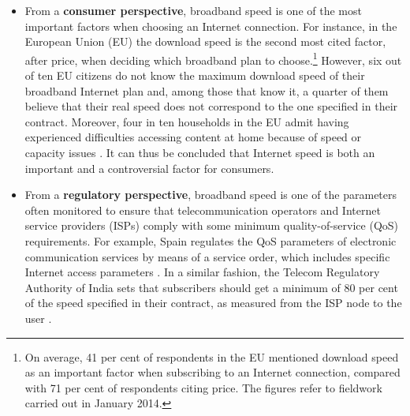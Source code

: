 \documentclass[12pt]{article}
\begin{document}
\begin{itemize}

	\item From a \textbf{consumer perspective}, broadband speed is one of the most important factors when choosing an Internet connection. For instance, in the European Union (EU) the download speed is the second most cited factor, after price, when deciding which broadband plan to choose.\footnote{On average, 41 per cent of respondents in the EU mentioned download speed as an important factor when subscribing to an Internet connection, compared with 71 per cent of respondents citing price. The figures refer to fieldwork carried out in January 2014.} However, six out of ten EU citizens do not know the maximum download speed of their broadband Internet plan and, among those that know it, a quarter of them believe that their real speed does not correspond to the one specified in their contract. Moreover, four in ten households in the EU admit having experienced difficulties accessing content at home because of speed or capacity issues \citep{eurobarometer}. It can thus be concluded that Internet speed is both an important and a controversial factor for consumers. 
	
	\item From a \textbf{regulatory perspective}, broadband speed is one of the parameters often monitored to ensure that telecommunication operators and Internet service providers (ISPs) comply with some minimum quality-of-service (QoS) requirements. For example, Spain regulates the QoS parameters of electronic communication services by means of a service order, which includes specific Internet access parameters \citep[Annex I, Part II in ][]{boe}. In a similar fashion, the Telecom Regulatory Authority of India sets that subscribers should get a minimum of 80 per cent of the speed specified in their contract, as measured from the ISP node to the user \citep{trai2006}.         
	

\end{itemize}
\end{document}
